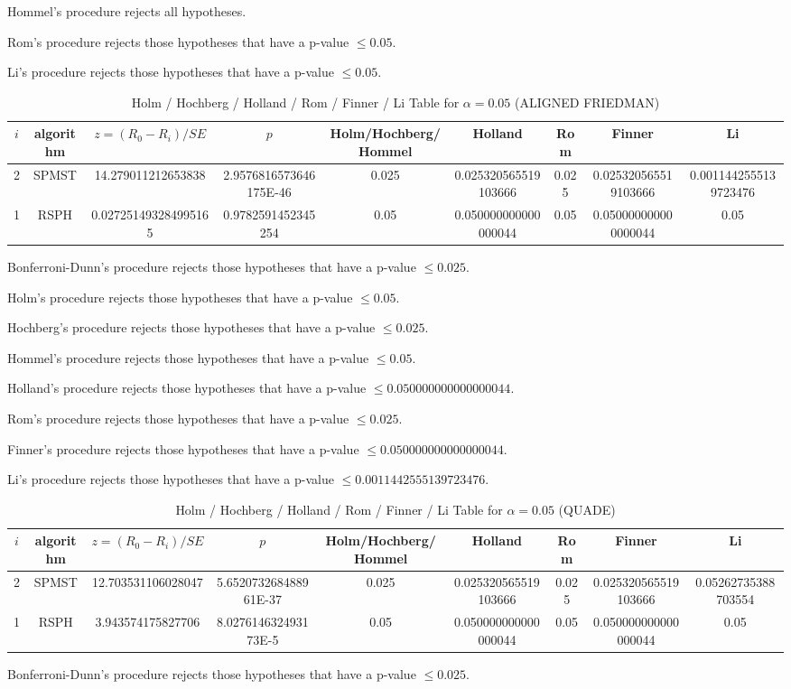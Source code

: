 \documentclass[a4paper,10pt]{article}
\begin{document}
\begin{landscape}
Hommel's procedure rejects all hypotheses.


Rom's procedure rejects those hypotheses that have a p-value $\le0.05$.


Li's procedure rejects those hypotheses that have a p-value $\le0.05$.



\newpage

\begin{table}[!htp]
\centering\scriptsize
\caption{Holm / Hochberg / Holland / Rom / Finner / Li Table for $\alpha=0.05$ (ALIGNED FRIEDMAN)}
\begin{tabular}{ccccccccc}
$i$&algorithm&$z=(R_0 - R_i)/SE$&$p$&Holm/Hochberg/Hommel&Holland&Rom&Finner&Li\\
\hline
2&SPMST&14.279011212653838&2.9576816573646175E-46&0.025&0.025320565519103666&0.025&0.025320565519103666&0.0011442555139723476\\
1&RSPH&0.027251493284995165&0.9782591452345254&0.05&0.050000000000000044&0.05&0.050000000000000044&0.05\\
\hline
\end{tabular}
\end{table}
Bonferroni-Dunn's procedure rejects those hypotheses that have a p-value $\le0.025$.


Holm's procedure rejects those hypotheses that have a p-value $\le0.05$.


Hochberg's procedure rejects those hypotheses that have a p-value $\le0.025$.


Hommel's procedure rejects those hypotheses that have a p-value $\le0.05$.


Holland's procedure rejects those hypotheses that have a p-value $\le0.050000000000000044$.


Rom's procedure rejects those hypotheses that have a p-value $\le0.025$.


Finner's procedure rejects those hypotheses that have a p-value $\le0.050000000000000044$.


Li's procedure rejects those hypotheses that have a p-value $\le0.0011442555139723476$.



\newpage

\begin{table}[!htp]
\centering\scriptsize
\caption{Holm / Hochberg / Holland / Rom / Finner / Li Table for $\alpha=0.05$ (QUADE)}
\begin{tabular}{ccccccccc}
$i$&algorithm&$z=(R_0 - R_i)/SE$&$p$&Holm/Hochberg/Hommel&Holland&Rom&Finner&Li\\
\hline
2&SPMST&12.703531106028047&5.652073268488961E-37&0.025&0.025320565519103666&0.025&0.025320565519103666&0.05262735388703554\\
1&RSPH&3.943574175827706&8.027614632493173E-5&0.05&0.050000000000000044&0.05&0.050000000000000044&0.05\\
\hline
\end{tabular}
\end{table}
Bonferroni-Dunn's procedure rejects those hypotheses that have a p-value $\le0.025$.



\end{landscape}
\end{document}
